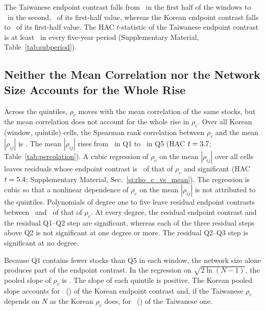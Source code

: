 \documentclass[a4paper,fleqn]{cas-sc}
\begin{document}
The Taiwanese endpoint contrast falls from \rhoCGapEndpointEarlyTw\ in the first half of the windows to \rhoCGapEndpointLateTw\ in the second, \rhoCGapLateShareOfEarlyTwPct\ of its first-half value, whereas the Korean endpoint contrast falls to \rhoCGapLateShareOfEarlyPct\ of its first-half value. The HAC $t$-statistic of the Taiwanese endpoint contrast is at least \tHacYearBlockTwA\ in every five-year period (Supplementary Material, Table~\ref{tab:subperiod}).

\subsection{Neither the Mean Correlation nor the Network Size Accounts for the Whole Rise}\label{subsec:threshold_vs_mean}

Across the quintiles, $\rho_c$ moves with the mean correlation of the same stocks, but the mean correlation does not account for the whole rise in $\rho_c$. Over all Korean (window, quintile) cells, the Spearman rank correlation between $\rho_c$ and the mean $|\rho_{ij}|$ is \meanCorrSpearman. The mean $|\rho_{ij}|$ rises from \meanAbsCorrQone\ in Q1 to \meanAbsCorrQfive\ in Q5 (HAC $t = 3.7$; Table~\ref{tab:percolation}). A cubic regression of $\rho_c$ on the mean $|\rho_{ij}|$ over all cells leaves residuals whose endpoint contrast is \rhoCResidGapPctOfRaw\ of that of $\rho_c$ and significant (HAC $t = 5.4$; Supplementary Material, Sec.~\ref{si:rho_c_vs_mean}). The regression is cubic so that a nonlinear dependence of $\rho_c$ on the mean $|\rho_{ij}|$ is not attributed to the quintiles. Polynomials of degree one to five leave residual endpoint contrasts between \rhoCResidGapPctOfRawDegLo\ and \rhoCResidGapPctOfRawDegHi\ of that of $\rho_c$. At every degree, the residual endpoint contrast and the residual Q1--Q2 step are significant, whereas each of the three residual steps above Q2 is not significant at one degree or more. The residual Q2--Q3 step is significant at no degree.

Because Q1 contains fewer stocks than Q5 in each window, the network size alone produces part of the endpoint contrast. In the regression on $\sqrt{2\ln(N-1)}$, the pooled slope of $\rho_c$ is \rhoCSlopeSqrtLogN. The slope of each quintile is positive. The Korean pooled slope accounts for \rhoCGapKrNImplied\ (\rhoCGapKrNImpliedPct) of the Korean endpoint contrast and, if the Taiwanese $\rho_c$ depends on $N$ as the Korean $\rho_c$ does, for \rhoCGapTwNImplied\ (\rhoCGapTwNImpliedPct) of the Taiwanese one.
\end{document}
